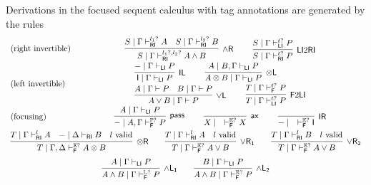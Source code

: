\documentclass[submission,copyright,creativecommons]{eptcs}
\theoremstyle{definition}
\newcommand{\tl}{\otimes \mathsf{L}}
\newcommand{\tr}{\otimes \mathsf{R}}
\newcommand{\pass}{\mathsf{pass}}
\newcommand{\unitl}{\mathsf{IL}}
\newcommand{\unitr}{\mathsf{IR}}
\newcommand{\andlone}{\land \mathsf{L_{1}}}
\newcommand{\andltwo}{\land \mathsf{L_{2}}}
\newcommand{\andr}{\land \mathsf{R}}
\newcommand{\orl}{\lor \mathsf{L}}
\newcommand{\orrone}{\lor \mathsf{R_{1}}}
\newcommand{\orrtwo}{\lor \mathsf{R_{2}}}
\newcommand{\ax}{\mathsf{ax}}
\newcommand{\ot}{\otimes}
\newcommand{\I}{\mathsf{I}}
\newcommand{\RI}{\mathsf{RI}}
\newcommand{\LI}{\mathsf{LI}}
\newcommand{\F}{\mathsf{F}}
\newcommand{\tP}{\mathbb{P}}
\newcommand{\tL}{\mathbb{L}}
\newcommand{\tR}{\mathbb{R}}
\newcommand{\tE}{\mathbb{E}}
\newcommand{\proofbox}[1]{\begin{tabular}{l} #1 \end{tabular}}
\begin{document}
Derivations in the focused sequent calculus with tag annotations are generated by the rules
\begin{equation}\label{eq:focus}
  \begin{array}{lc}
    \text{(right invertible)} & %
    \proofbox{
      \infer[\andr]{S \mid \Gamma \vdash^{l_1?, l_2?}_{\RI} A \land B}{
        S \mid \Gamma \vdash^{l_1?}_{\RI} A
        &
        S \mid \Gamma \vdash^{l_2?}_{\RI} B
      }
    \qquad
    \infer[\LI 2 \RI]{S \mid \Gamma \vdash^{t?}_{\RI} P}{S \mid \Gamma \vdash^{t?}_{\LI} P}
    }
    \\[10pt]
    \text{(left invertible)} & %
    \proofbox{
      \infer[\unitl]{\I \mid \Gamma \vdash_{\LI} P}{{-} \mid \Gamma \vdash_{\LI} P}
    \qquad
    \infer[\tl]{A \ot B \mid \Gamma \vdash_{\LI} P}{A \mid B , \Gamma \vdash_{\LI} P}
    \\
    \infer[\orl]{A \lor B \mid \Gamma \vdash P}{
      A \mid \Gamma \vdash P
      &
      B \mid \Gamma \vdash P
    }
    \qquad
    \infer[\F 2 \LI]{T \mid \Gamma \vdash^{t?}_{\LI} P}{T \mid \Gamma \vdash^{t?}_{\F} P}
    }
    \\[10pt]
    \text{(focusing)} &    %
    \proofbox{
    \infer[\pass]{{-} \mid A , \Gamma \vdash^{\tP?}_{\F} P }{
        A \mid \Gamma \vdash_{\LI} P
    }
    \qquad
    \infer[\ax]{X \mid \quad \vdash^{\tE?}_{\F} X}{}
    \qquad
    \infer[\unitr]{{-} \mid \quad \vdash^{\tE?}_{\F} \I}{}
    }
    \\[10pt]
    \multicolumn{2}{c}{
    \infer[\tr]{T \mid \Gamma , \Delta \vdash^{\tE?}_{\F} A \ot B}{
      T \mid \Gamma \vdash^{l}_{\RI} A
      &
      {-} \mid \Delta \vdash_{\RI} B
      &
      l \ \text{valid}
    }
    \qquad
    \infer[\orrone]{T \mid \Gamma \vdash^{\tE?}_{\F} A \lor B}{
      T \mid \Gamma \vdash^{l}_{\RI} A
      &
      l \ \text{valid}
    }
    \qquad
    \infer[\orrtwo]{T \mid \Gamma \vdash^{\tE?}_{\F} A \lor B}{
      T \mid \Gamma \vdash^{l}_{\RI} B
      &
      l \ \text{valid}
    }
    }
    \\[6pt]
    \multicolumn{2}{c}{
    \infer[\andlone]{A \land B \mid \Gamma \vdash^{\tL?}_{\F} P}{A \mid \Gamma \vdash_{\LI} P}
    \qquad
    \infer[\andltwo]{A \land B \mid \Gamma \vdash^{\tR?}_{\F} P}{B \mid \Gamma \vdash_{\LI} P}
    }
  \end{array}
\end{equation}
\end{document}
